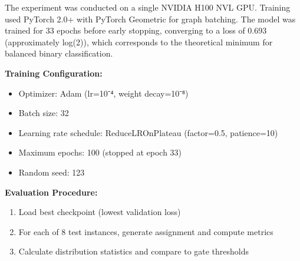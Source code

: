 
The experiment was conducted on a single NVIDIA H100 NVL GPU. Training used PyTorch 2.0+ with PyTorch Geometric for graph batching. The model was trained for 33 epochs before early stopping, converging to a loss of 0.693 (approximately log(2)), which corresponds to the theoretical minimum for balanced binary classification.

\textbf{Training Configuration:}
\begin{itemize}
\item Optimizer: Adam (lr=10⁻⁴, weight decay=10⁻⁸)
\item Batch size: 32
\item Learning rate schedule: ReduceLROnPlateau (factor=0.5, patience=10)
\item Maximum epochs: 100 (stopped at epoch 33)
\item Random seed: 123
\end{itemize}

\textbf{Evaluation Procedure:}
\begin{enumerate}
\item Load best checkpoint (lowest validation loss)
\item For each of 8 test instances, generate assignment and compute metrics
\item Calculate distribution statistics and compare to gate thresholds
\end{enumerate}
